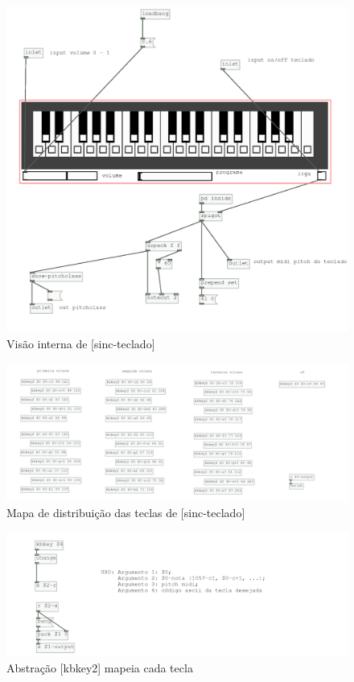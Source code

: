 \documentclass[draft]{ppgmus}
\begin{document}
\begin{figure}
\includegraphics[scale=.5]{sinc-teclado-interno}
\caption{Visão interna de [sinc-teclado]}
\label{sinc-teclado-interno}
\end{figure}

\begin{figure}
\includegraphics[scale=.5]{sinc-teclado-mapa}
\caption{Mapa de distribuição das teclas de [sinc-teclado]}
\label{sinc-teclado-mapa}
\end{figure}

\begin{figure}
\includegraphics[scale=.5]{kbbey2}
\caption{Abstração [kbkey2] mapeia cada tecla}
\label{kbbey2}
\end{figure}
\end{document}
